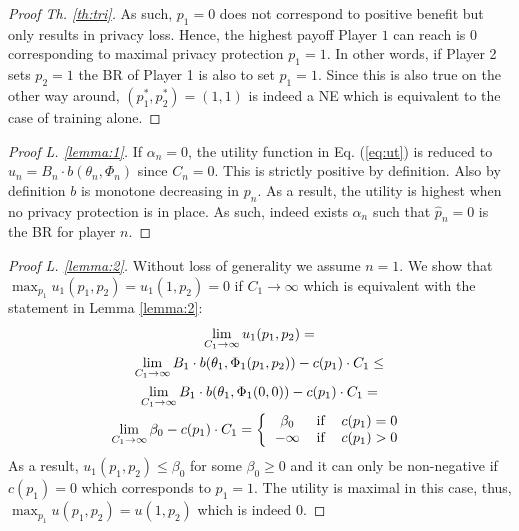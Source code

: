 \documentclass[USenglish,oneside,twocolumn]{article}
\theoremstyle{plain}
\begin{document}
\begin{appendices}
\begin{proof}[Proof Th. \ref{th:tri}]
            As such, $p_1=0$ does not correspond to positive benefit but only results in privacy loss. Hence, the highest payoff Player $1$ can reach is $0$ corresponding to maximal privacy protection $p_1=1$. In other words, if Player 2 sets $p_2=1$ the BR of Player 1 is also to set $p_1=1$. Since this is also true on the other way around, $(p_1^*,p_2^*)=(1,1)$ is indeed a NE which is equivalent to the case of training alone.
        \end{proof}
        
        \begin{proof}[Proof L. \ref{lemma:1}]
            If $\alpha_n=0$, the utility function in Eq. (\ref{eq:ut}) is reduced to $u_n=B_n\cdot b(\theta_n,\Phi_n)$ since $C_n=0$. This is strictly positive by definition. Also by definition $b$ is monotone decreasing in $p_n$. As a result, the utility is highest when no privacy protection is in place. As such, indeed exists $\alpha_n$ such that $\hat{p}_n=0$ is the BR for player $n$.
        \end{proof}
        
        
        \begin{proof}[Proof L. \ref{lemma:2}]
            Without loss of generality we assume $n=1$. We show that $\max_{p_1}u_1(p_1,p_2)=u_1(1,p_2)=0$ if $C_1\rightarrow\infty$ which is equivalent with the statement in Lemma \ref{lemma:2}:
            \begin{equation}
            \begin{gathered}
            \lim_{C_1\rightarrow \infty}u_1(p_1,p_2)=\\
            \lim_{C_1\rightarrow \infty}B_1\cdot b(\theta_1,\Phi_1(p_1,p_2))-c(p_1)\cdot C_1\leq\\
            \lim_{C_1\rightarrow \infty}B_1\cdot b(\theta_1,\Phi_1(0,0))-c(p_1)\cdot C_1=\\
            \lim_{C_1\rightarrow \infty}\beta_0-c(p_1)\cdot C_1=\left\{
            \begin{tabular}{ccc}
            $\beta_0$ & if & $c(p_1)=0$\\
            $-\infty$ & if & $c(p_1)>0$\\
            \end{tabular}\right.
            \end{gathered}
            \end{equation}
            As a result, $u_1(p_1,p_2)\leq\beta_0$ for some $\beta_0\geq0$ and it can only be non-negative if $c(p_1)=0$ which corresponds to $p_1=1$. The utility is maximal in this case, thus, $\max_{p_1}u(p_1,p_2)=u(1,p_2)$ which is indeed 0.
        \end{proof}
        

\end{appendices}
\end{document}
